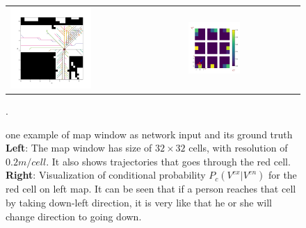 \begin{figure}[hp]
\centering
\begin{tabular}{ll}
\includegraphics[width=0.48\textwidth]{figures/trajs_through_cell.png}
&
\includegraphics[width=0.48\textwidth]{figures/probs_on_that_cell_2.png}
\end{tabular}
\caption[One example of map window as network input and its ground truth]{one example of map window as network input and its ground truth \textbf{Left}: The map window has size of \( 32 \times 32 \) cells, with resolution of \( 0.2m/cell\). It also shows trajectories that goes through the red cell. \textbf{Right}: Visualization of conditional probability \( P_c(V^{ex} | V^{en}) \) for the red cell on left map. It can be seen that if a person reaches that cell by taking down-left direction, it is very like that he or she will change direction to going down.}. 
\label{fig:trajs}

\vspace*{\floatsep}


\end{figure}

